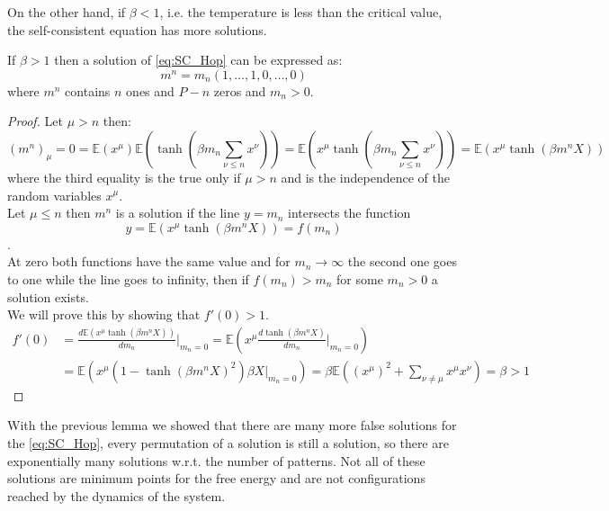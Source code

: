 On the other hand, if $\beta < 1$, i.e. the temperature is less than the critical value, the self-consistent equation has more solutions.
\begin{lemma}
    If $\beta > 1$ then a solution of \cref{eq:SC_Hop} can be expressed as:
    \[
    m^n= m_n(1,\ldots,1,0,\ldots,0)
    \]
    where $m^n$ contains $n$ ones and $P-n$ zeros and $m_n>0$.
    \begin{proof}
    	Let $\mu >n $ then:
    	\[
    	(m^n)_\mu = 0 = \mathbb{E}(x^\mu)\mathbb{E}(\tanh(\beta m_n \sum_{\nu \leq n} x^\nu)) =  \mathbb{E}(x^\mu \tanh(\beta m_n \sum_{\nu \leq n} x^\nu)) = \mathbb{E}(x^\mu \tanh(\beta m^n X))
    	\]
    	where the third equality is the true only if $\mu >n$ and is the independence of the random variables $x^\mu$.\\
    	Let $\mu \leq n$ then $m^n$ is a solution if the line $y = m_n$ intersects the function $$y =  \mathbb{E}(x^\mu \tanh(\beta m^n X))=f(m_n)$$. \\
    	At zero both functions have the same value and for $m_n \to \infty$ the second one goes to one while the line goes to infinity, then if $f(m_n) > m_n$ for some $m_n >0$ a solution exists.\\
    	We will prove this by showing that $f'(0) > 1$.
    	\begin{align*}
    		f'(0) &= \frac{d\mathbb{E}(x^\mu \tanh(\beta m^n X))}{dm_n} \big|_{m_n=0} = \mathbb{E}(x^\mu \frac{d \tanh(\beta m^n X)}{dm_n} \big|_{m_n=0} ) \\
    		&= \mathbb{E}(x^\mu  (1 - \tanh(\beta m^n X)^2 ) \beta X \big|_{m_n=0} ) =\beta  \mathbb{E}((x^\mu)^2 + \sum_{\nu \neq \mu } x^\mu x^\nu ) = \beta > 1
    	\end{align*}
    \end{proof}
\end{lemma}
With the previous lemma we showed that there are many more false solutions for the \cref{eq:SC_Hop}, every permutation of a solution is still a solution, so there are exponentially many solutions w.r.t. the number of patterns. Not all of these solutions are minimum points for the free energy and are not configurations reached by the dynamics of the system.
